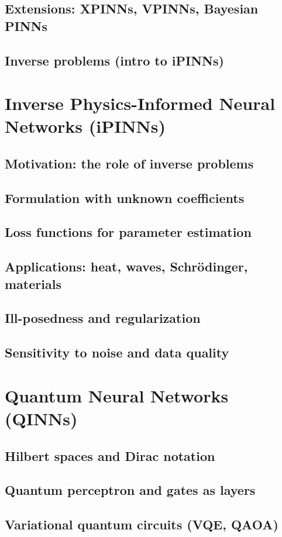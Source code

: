 \section{Extensions: XPINNs, VPINNs, Bayesian PINNs}
\section{Inverse problems (intro to iPINNs)}

\chapter{Inverse Physics-Informed Neural Networks (iPINNs)}
\section{Motivation: the role of inverse problems}
\section{Formulation with unknown coefficients}
\section{Loss functions for parameter estimation}
\section{Applications: heat, waves, Schrödinger, materials}
\section{Ill-posedness and regularization}
\section{Sensitivity to noise and data quality}

\chapter{Quantum Neural Networks (QINNs)}
\section{Hilbert spaces and Dirac notation}
\section{Quantum perceptron and gates as layers}
\section{Variational quantum circuits (VQE, QAOA)}
